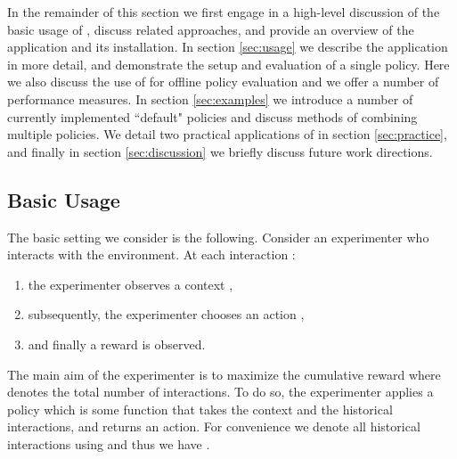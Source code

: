 \documentclass[nojss]{jss}
\begin{document}
In the remainder of this section we first engage in a high-level discussion of the basic usage of , discuss related approaches, and provide an overview of the application and its installation. In section \ref{sec:usage} we describe the application in more detail, and demonstrate the setup and evaluation of a single policy. Here we also discuss the use of  for offline policy evaluation and we offer a number of performance measures. In section \ref{sec:examples} we introduce a number of currently implemented ``default" policies and discuss methods of combining multiple policies. We detail two practical applications of  in section \ref{sec:practice}, and finally in section \ref{sec:discussion} we briefly discuss future work directions. 

\subsection{Basic Usage}

The basic setting we consider is the following. Consider an experimenter who interacts with the environment. At each interaction :
\begin{enumerate}
\item the experimenter observes a context ,
\item subsequently, the experimenter chooses an action ,
\item and finally a reward  is observed.
\end{enumerate}
The main aim of the experimenter is to maximize the cumulative reward  where  denotes the total number of interactions. To do so, the experimenter applies a policy  which is some function that takes the context  and the historical interactions, and returns an action. For convenience we denote all historical interactions using  and thus we have . 
\end{document}
